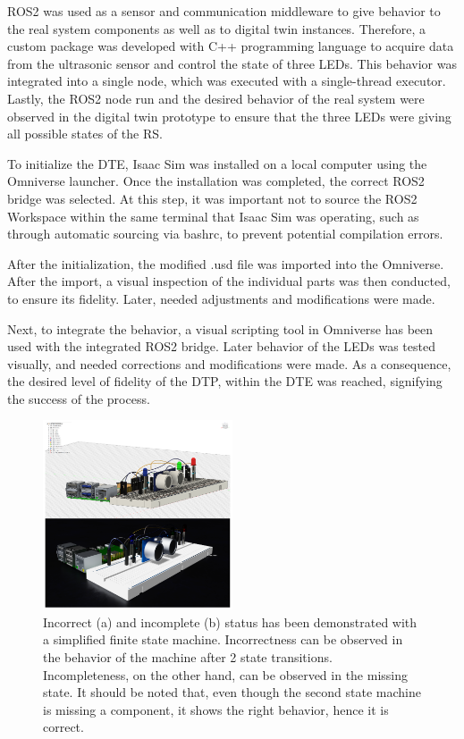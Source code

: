 \documentclass[conference]{IEEEtran}
\begin{document}
    ROS2 was used as a sensor and communication middleware to give behavior to the real system components as well as to digital twin instances. Therefore, a custom package was developed with
    C++ programming language to acquire data from the ultrasonic sensor and control the state of three LEDs. This behavior was integrated into a single node, which was executed with a single-thread executor. 
    Lastly, the ROS2 node run and the desired behavior of the real system were observed in the digital twin prototype to ensure that the three LEDs were giving all possible states of the RS.

    To initialize the DTE, Isaac Sim was installed on a local computer using the Omniverse launcher. Once the installation was completed, the correct ROS2 bridge was selected. 
    At this step, it was important not to source the ROS2 Workspace within the same terminal that Isaac Sim was operating, such as through automatic sourcing via bashrc, to prevent potential compilation errors. 

    After the initialization, the modified .usd file was imported into the Omniverse. 
    After the import, a visual inspection of the individual parts was then conducted, to ensure its fidelity. Later,  needed adjustments and modifications were made. 

    Next, to integrate the behavior, a visual scripting tool in Omniverse has been used with the integrated ROS2 bridge. Later behavior of the LEDs was tested visually, 
    and needed corrections and modifications were made. As a consequence, the desired level of fidelity of the DTP, within the DTE was reached, signifying the success of the process.

    
    \begin{figure}[htbp]
        \centering
        \includegraphics[width=0.5\textwidth]{Left.png}
        \caption{Incorrect (a) and incomplete (b) status has been demonstrated with a simplified finite state machine. Incorrectness can be observed in the behavior 
        of the machine after 2 state transitions. Incompleteness, on the other hand, can be observed in the missing state. It should be noted that, even though the second state machine is missing a 
        component, it shows the right behavior, hence it is correct.}\label{fig:Left}
    \end{figure}
\end{document}
